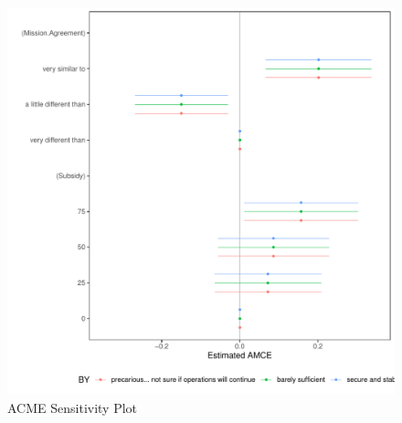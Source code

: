 \begin{figure}
\centering
    \includegraphics[width=.95\columnwidth]{./Pictures/acmeSensitivity.pdf}
    \caption{ACME Sensitivity Plot}
    \label{fig:acmesens}
\end{figure}



